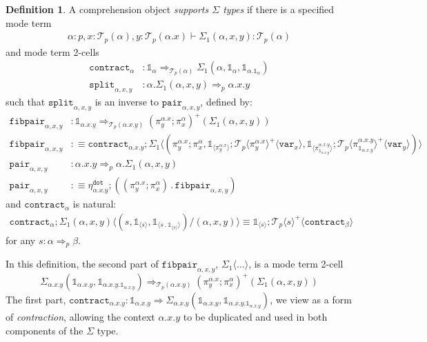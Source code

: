 \documentclass[10pt]{article}
\theoremstyle{definition}
\newtheorem{definition}{Definition}
\newcommand{\tcell}{\Rightarrow}
\newcommand\TrPlus[2]{\ensuremath{{#1}^+(#2)}}
\newcommand\El[2]{\mathcal{T}_{#1}(#2)}
\newcommand\ApEl[2]{\mathcal{T}_{#1}\langle#2\rangle}
\newcommand\bdot[0]{\mathbin{.}}
\newcommand\ap[2]{\ensuremath{#1 \langle #2 \rangle }}
\newcommand\ApPlus[2]{\ensuremath{{#1}^+ \langle #2 \rangle }}
\newcommand{\tdot}{\ensuremath{\mathtt{dot}}}
\newcommand\One{\ensuremath{\mathds{1}}}
\newcommand\var[1]{\ensuremath{\mathtt{var}_{#1}}}
\newcommand\ApOne[1]{\ensuremath{\One_{\langle {#1} \rangle }}}
\newcommand\contract[1]{\ensuremath{\mathtt{contract}_{#1}}}
\newcommand\fibpair[1]{\ensuremath{\mathtt{fibpair}_{#1}}}
\newcommand\pair[1]{\ensuremath{\mathtt{pair}_{#1}}}
\newcommand\tsplit[1]{\ensuremath{\mathtt{split}_{#1}}}
\begin{document}
\begin{definition}\label{def:supports-sigmas}
A comprehension object \emph{supports $\Sigma$ types} if there is a specified mode term
\begin{align*}
\alpha : p, x : \El{p}{\alpha}, y : \El{p}{\alpha.x} \vdash \Sigma_1(\alpha,x,y) : \El{p}{\alpha}
\end{align*}
and mode term 2-cells
\begin{align*}
\contract{\alpha} &: \One_\alpha \tcell_{\El{p}{\alpha}} \Sigma_1(\alpha,\One_\alpha,\One_{\alpha.{\One_\alpha}}) \\
\tsplit{\alpha,x,y} &: \alpha.\Sigma_1(\alpha,x,y) \tcell_{p} \alpha.x.y
\end{align*}
such that $\tsplit{\alpha,x,y}$ is an inverse to $\pair{\alpha,x,y}$, defined by:
\begin{align*}
\fibpair{\alpha,x,y} &: \One_{\alpha.x.y} \tcell_{\El{p}{\alpha.x.y}} \TrPlus{(\pi^{\alpha.x}_y;\pi^\alpha_x)}{\Sigma_1(\alpha,x,y)} \\
\fibpair{\alpha,x,y} &:\equiv \contract{\alpha.x.y};\ap{\Sigma_1}{(\pi^{\alpha.x}_y;\pi^{\alpha}_x,\ApOne{\pi^{\alpha.x}_y};\ApPlus{\ApEl{p}{\pi^{\alpha.x}_y}}{\var{x}}, \ApOne{\pi^{\alpha.x.y}_{\One_{\alpha.x.y}}};\ApPlus{\ApEl{p}{\pi^{\alpha.x.y}_{\One_{\alpha.x.y}}}}{\var{y}})} \\
\pair{\alpha,x,y} &: \alpha.x.y \tcell_{p} \alpha.\Sigma_1(\alpha,x,y) \\
\pair{\alpha, x, y} &:\equiv \eta^\tdot_{\alpha.x.y};((\pi^{\alpha.x}_y;\pi^\alpha_x) \bdot \fibpair{\alpha,x,y})
\end{align*}
and $\contract{\alpha}$ is natural:
\begin{align}
\contract{\alpha};\ap{\Sigma_1(\alpha,x,y)}{(s, \ApOne{s}, \ApOne{s \bdot \ApOne{s}})/(\alpha,x,y)} \equiv \ApOne{s};\ApPlus{\ApEl{p}{s}}{\contract{\beta}}
\end{align}
for any $s : \alpha \tcell_p \beta$.
\end{definition}

In this definition, the second part of $\fibpair{\alpha,x,y}$,
$\ap{\Sigma_1}{\ldots}$, is a mode term 2-cell
\[
\Sigma_{\alpha.x.y}(\One_{\alpha.x.y},\One_{\alpha.x.y.\One_{\alpha.x.y}}) \tcell_{\El p {\alpha.x.y}} \TrPlus{(\pi^{\alpha.x}_y;\pi^\alpha_x)}{\Sigma_1(\alpha,x,y)}
\]
The first part, $\contract{\alpha.x.y} : \One_{\alpha.x.y} \tcell
\Sigma_{\alpha.x.y}(\One_{\alpha.x.y},\One_{\alpha.x.y.\One_{\alpha.x.y}})$,
we view as a form of \emph{contraction}, allowing the context
$\alpha.x.y$ to be duplicated and used in both components of the
$\Sigma$ type.
\end{document}
